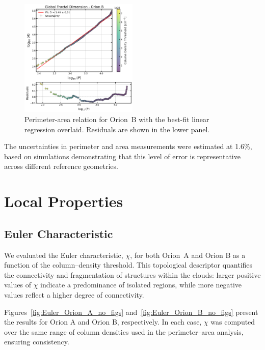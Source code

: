 \begin{figure}[t]
    \centering
    \includegraphics[width=0.5\textwidth]{figures/orion_B_global.png}
    \caption{Perimeter-area relation for Orion~B with the best-fit linear regression overlaid. Residuals are shown in the lower panel.}
    \label{fig:orion_B_global}
\end{figure}

The uncertainties in perimeter and area measurements were estimated at 1.6\%, based on simulations demonstrating that this level of error is representative across different reference geometries.

\section{Local Properties}

\subsection{Euler Characteristic}

We evaluated the Euler characteristic, \(\chi\), for both Orion~A and Orion B as a function of the column–density threshold. This topological descriptor quantifies the connectivity and fragmentation of structures within the clouds: larger positive values of \(\chi\) indicate a predominance of isolated regions, while more negative values reflect a higher degree of connectivity.

Figures~\ref{fig:Euler_Orion_A_no_figs} and~\ref{fig:Euler_Orion_B_no_figs} present the results for Orion A and Orion B, respectively. In each case, \(\chi\) was computed over the same range of column densities used in the perimeter–area analysis, ensuring consistency.

